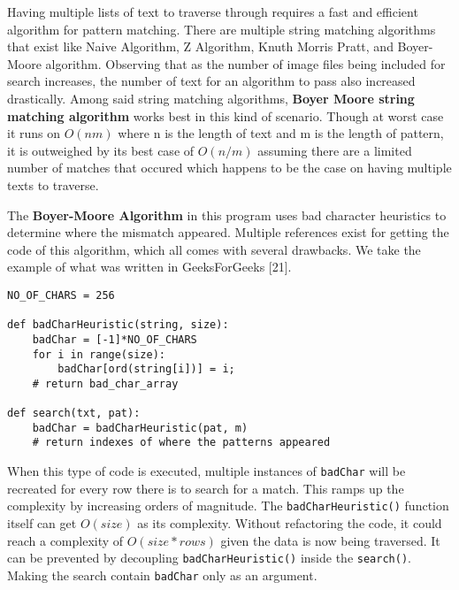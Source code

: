 \hspace\parindent
Having multiple lists of text to traverse through requires a fast and efficient algorithm for
pattern matching. There are multiple string matching algorithms that exist like Naive Algorithm, Z
Algorithm, Knuth Morris Pratt, and Boyer-Moore algorithm.  Observing that
as the number of image files being included for search increases, the number of text for 
an algorithm to pass also increased drastically. Among said string matching algorithms,
\textbf{Boyer Moore string matching algorithm} works best in this kind of scenario. Though at worst
case it runs on $O(nm)$ where n is the length of text and m is the length of pattern, it is outweighed
by its best case of $O(n/m)$ assuming there are a limited number of matches that occured which happens to
be the case on having multiple texts to traverse.

\hfill

The \textbf{Boyer-Moore Algorithm} in this program uses bad character heuristics to determine where
the mismatch appeared. Multiple references exist for getting the code of this algorithm, which all
comes with several drawbacks. We take the example of what was written in GeeksForGeeks [21]. 

\hfill

\begin{tcolorbox}[colback=white, title=\textbf{Bad Character Preprocessing}]
    \begin{lstlisting}[style=py]
NO_OF_CHARS = 256
 
def badCharHeuristic(string, size):
    badChar = [-1]*NO_OF_CHARS
    for i in range(size):
        badChar[ord(string[i])] = i;
    # return bad_char_array

def search(txt, pat):
    badChar = badCharHeuristic(pat, m)
    # return indexes of where the patterns appeared
\end{lstlisting}
\end{tcolorbox}


\hfill

When this type of code is executed, multiple instances of \texttt{badChar} will be recreated for
every row there is to search for a match. This ramps up the complexity by increasing orders of
magnitude. The \texttt{badCharHeuristic()} function itself can get $O(size)$ as its complexity.
Without refactoring the code, it could reach a complexity of $O(size*rows)$ given the data is now
being traversed. It can be
prevented by decoupling \texttt{badCharHeuristic()} inside the \texttt{search()}. Making the search
contain \texttt{badChar} only as an argument.

